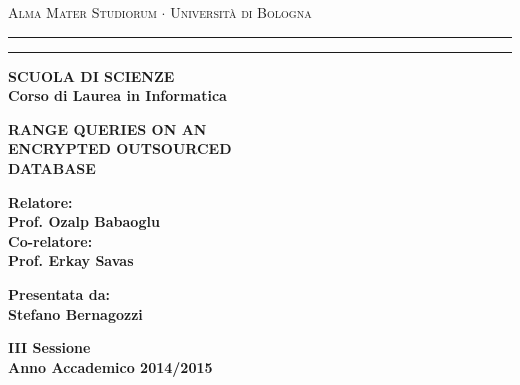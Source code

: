 \textwidth=450pt\oddsidemargin=0pt

%
	\begin{titlepage}
		\begin{center}
			{{\Large{\textsc{Alma Mater Studiorum $\cdot$ Universit\`a di
							Bologna}}}} \rule[0.1cm]{15.8cm}{0.1mm}
			\rule[0.5cm]{15.8cm}{0.6mm}
			{\small{\bf SCUOLA DI SCIENZE\\
					Corso di Laurea in Informatica }}
		\end{center}
		\vspace{15mm}
		\begin{center}
			{\LARGE{\bf RANGE QUERIES ON AN}}\\
			\vspace{3mm}
			{\LARGE{\bf ENCRYPTED OUTSOURCED}}\\
			\vspace{3mm}
			{\LARGE{\bf DATABASE}}\\
			\vspace{3mm}
		\end{center}
		\vspace{40mm}
		\par
		\noindent
		\begin{minipage}[t]{0.47\textwidth}
			{\large{\bf Relatore:\\
					Prof. Ozalp Babaoglu}}\\
			{\large{\bf Co-relatore:\\
					Prof. Erkay Savas}}
		\end{minipage}
		\hfill
		\begin{minipage}[t]{0.47\textwidth}\raggedleft
			{\large{\bf Presentata da:\\
					Stefano Bernagozzi}}
		\end{minipage}
		\vspace{20mm}
		\begin{center}
			{\large{\bf III Sessione\\%
					Anno Accademico 2014/2015 }}%
		\end{center}
	\end{titlepage}
%